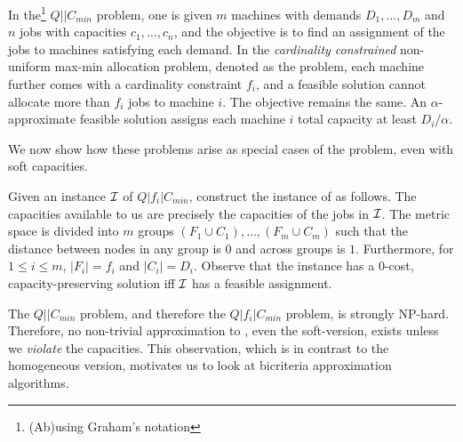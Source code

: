 \begin{definition}
In the\footnote{(Ab)using Graham's notation} $Q||C_{min}$ problem, one is given $m$ machines with demands $D_1,\ldots,D_m$ and $n$ jobs with capacities $c_1,\ldots,c_n$,
and the objective is to find an assignment of the jobs to machines satisfying each demand.
In the {\em cardinality constrained}  non-uniform max-min allocation problem, denoted as the \cckp problem, each machine further comes with a cardinality constraint $f_i$, and a feasible solution cannot allocate more than $f_i$ jobs to machine $i$. The objective remains the same. An $\alpha$-approximate feasible solution assigns each machine $i$  total capacity at least $ D_i/\alpha$.
\end{definition}
\noindent
We now show how these problems arise as special cases
of the \mckc problem, even with soft capacities.
\begin{remark}\label{rem:cckp}
	Given an instance ${\cal I}$ of $Q|f_i|C_{min}$, construct the instance of \mckc as follows. The capacities available to us are precisely the capacities of the jobs in ${\cal I}$.
	The metric space is divided into $m$ groups $(F_1\cup C_1),\ldots,(F_m\cup C_m)$ such that the distance between nodes in any group is $0$ and across groups is $1$.
	Furthermore, for $1\leq i\leq m$, $|F_i| = f_i$ and $|C_i| = D_i$. Observe that the \mckc instance has a $0$-cost, capacity-preserving solution iff ${\cal I}$ has a feasible assignment.
\end{remark}
The $Q||C_{min}$ problem, and therefore the $Q|f_i|C_{min}$ problem,  is strongly NP-hard. Therefore, no non-trivial approximation to \mckc, even the soft-version, exists unless we {\em violate} the capacities.
This observation, which is in contrast to the homogeneous version, motivates us to look at bicriteria approximation algorithms.
%
%
%
%
%
